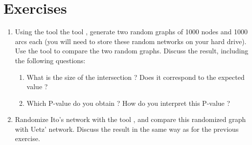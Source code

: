 \chapter{Exercises}

\begin{enumerate}

\item Using the tool the tool ,
  generate two random graphs of 1000 nodes and 1000 arcs each (you
  will need to store these random networks on your hard drive).  Use
  the tool  to compare the two random
  graphs.
  Discuss the result, including the following questions: 
  \begin{enumerate}
  \item What is the size of the intersection ? Does it correspond to
    the expected value ? 
  \item Which P-value do you obtain ? How do you interpret this P-value ? 
  \end{enumerate}

\item Randomize Ito's network with the tool , and compare this randomized graph with Uetz'
  network. Discuss the result in the same way as for the previous
  exercise.

\end{enumerate}
